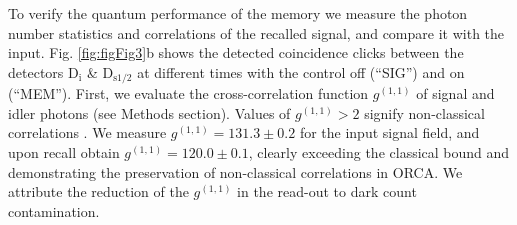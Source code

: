 \documentclass[12pt]{iopart}
\begin{document}
To verify the quantum performance of the memory we measure the photon number statistics and correlations of the recalled signal, and compare it with the input. Fig. \ref{fig:figFig3}b shows the detected coincidence clicks between the detectors $\mathrm{D_{i}}$ \& $\mathrm{D_{s1/2}}$ at different times with the control off (``SIG'') and on (``MEM''). First, we evaluate the cross-correlation function $g^{(1,1)}$ of signal and idler photons (see Methods section). Values of $g^{(1,1)}>2$ signify non-classical correlations \cite{Farrera2016}. We measure $g^{(1,1)}=131.3\pm0.2$ for the input signal field, and upon recall obtain $g^{(1,1)}=120.0\pm0.1$, clearly exceeding the classical bound and demonstrating the preservation of non-classical correlations in ORCA. We attribute the reduction of the $g^{(1,1)}$ in the read-out to dark count contamination.
\end{document}
